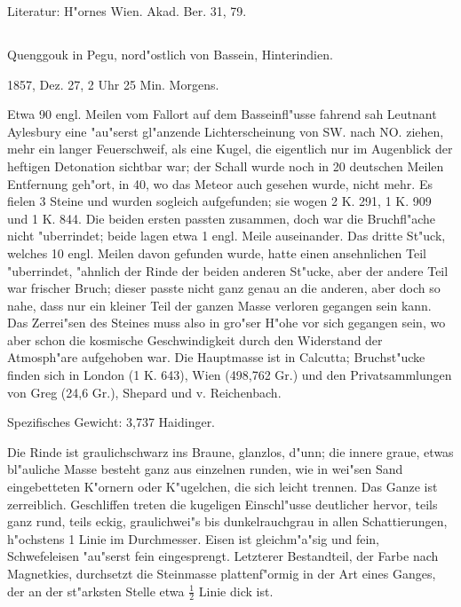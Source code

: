 \documentclass[a4paper, 11pt, oneside]{article}
\begin{document}
\normalsize
Literatur: H"ornes Wien. Akad. Ber. 31, 79.

\subsection{}
\LARGE
\paragraph{}
Quenggouk in Pegu, nord"ostlich von Bassein, Hinterindien.

1857, Dez. 27, 2 Uhr 25 Min. Morgens.

Etwa 90 engl. Meilen vom Fallort auf dem Basseinfl"usse fahrend sah Leutnant Aylesbury eine "au"serst gl"anzende Lichterscheinung von SW. nach NO. ziehen, mehr ein langer Feuerschweif, als eine Kugel, die eigentlich nur im Augenblick der heftigen Detonation sichtbar war; der Schall wurde noch in 20 deutschen Meilen Entfernung geh"ort, in 40, wo das Meteor auch gesehen wurde, nicht mehr. Es fielen 3 Steine und wurden sogleich aufgefunden; sie wogen 2 K. 291, 1 K. 909 und 1 K. 844. Die beiden ersten passten zusammen, doch war die Bruchfl"ache nicht "uberrindet; beide lagen etwa 1 engl. Meile auseinander. Das dritte St"uck, welches 10 engl. Meilen davon gefunden wurde, hatte einen ansehnlichen Teil "uberrindet, "ahnlich der Rinde der beiden anderen St"ucke, aber der andere Teil war frischer Bruch; dieser passte nicht ganz genau an die anderen, aber doch so nahe, dass nur ein kleiner Teil der ganzen Masse verloren gegangen sein kann. Das Zerrei"sen des Steines muss also in gro"ser H"ohe vor sich gegangen sein, wo aber schon die kosmische Geschwindigkeit durch den Widerstand der Atmosph"are aufgehoben war. Die Hauptmasse ist in Calcutta; Bruchst"ucke finden sich in London (1 K. 643), Wien (498,762 Gr.) und den Privatsammlungen von Greg (24,6 Gr.), Shepard und v. Reichenbach.

Spezifisches Gewicht: 3,737 Haidinger.

Die Rinde ist graulichschwarz ins Braune, glanzlos, d"unn; die innere graue, etwas bl"auliche Masse besteht ganz aus einzelnen runden, wie in wei"sen Sand eingebetteten K"ornern oder K"ugelchen, die sich leicht trennen. Das Ganze ist zerreiblich. Geschliffen treten die kugeligen Einschl"usse deutlicher hervor, teils ganz rund, teils eckig, graulichwei"s bis dunkelrauchgrau in allen Schattierungen, h"ochstens 1 Linie im Durchmesser. Eisen ist gleichm"a"sig und fein, Schwefeleisen "au"serst fein eingesprengt. Letzterer Bestandteil, der Farbe nach Magnetkies, durchsetzt die Steinmasse plattenf"ormig in der Art eines Ganges, der an der st"arksten Stelle etwa $\mathfrak{\frac{1}{2}}$ Linie dick ist.
\end{document}
